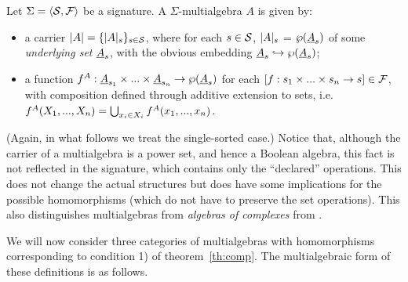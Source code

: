 \documentclass[10pt]{article}
\begin{document}

%
\begin{Definition}\label{de:multi}
Let $\Sigma = \langle {\cal S},{\cal F}\rangle$ be a signature. A $\Sigma$-multialgebra $A$
is given by:
\begin{itemize}
\item 
a carrier $|A|=\{|A|_s\}_{s\in {\cal S}}$, where for each $s\in
{\cal S}$, $|A|_s$ = $\wp(\underline {A}_s)$ of some {\em underlying set}
$\underline {A}_s$, with the obvious embedding $\underline {A}_s\hookrightarrow \wp(\underline {A}_s)$;
\item 
a function $f^A:\underline {A}_{s_1}\times...\times \underline {A}_{s_n}\rightarrow
\wp(\underline {A}_s)$ for each $[f:s_1\times...\times s_n\rightarrow s]\in {\cal F}$, 
with composition defined through additive extension to sets, i.e.\
 $f^A(X_1,...,X_n) = \bigcup_{x_i\in X_i} f^A(x_1,...,x_n)$.
\end{itemize}
\end{Definition}
%
(Again, in what follows we treat 
the single-sorted case.)
Notice that, although the carrier of a multialgebra is a power set, and hence a Boolean
algebra, this fact is not reflected in the signature, which contains only the 
``declared'' operations. This does not
change the actual structures but does have some implications for the
possible homomorphisms (which do not have to preserve the set operations).
This also distinguishes multialgebras from {\em algebras of complexes} 
from \cite{JT1}.



We will now consider three categories of multialgebras
with homomorphisms corresponding to condition 1) of
theorem~\ref{th:comp}. 
The multialgebraic form of these definitions is as follows.
\end{document}
